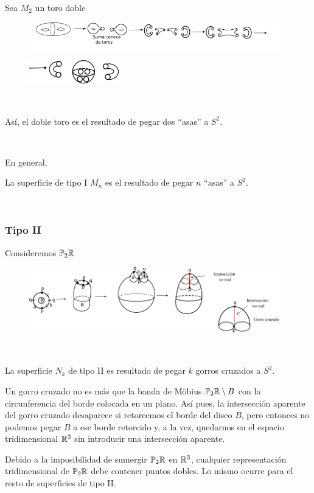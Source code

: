\documentclass[GTSResumen.tex]{subfiles}
\begin{document}
\begin{flushleft}\

Sea $M_2$ un toro doble

\begin{figure}[h!]
	\includegraphics[scale=0.9]{asa1ink}
\end{figure}
\begin{figure}[h!]
	\includegraphics[scale=0.9]{asa2ink}
\end{figure}\

Así, el doble toro es el resultado de pegar dos ``asas'' a $S^2$. 

\end{flushleft}\

En general,


\begin{teorema} La superficie de tipo I $M_n$ es el resultado de pegar $n$ ``asas'' a $S^2$.
\end{teorema}\
\subsubsection{Tipo II}

\begin{flushleft}
Consideremos $\mathbb{P}_2\mathbb{R}$
\begin{figure}[h!]
	\includegraphics[scale=0.7]{gorroink}
\end{figure}
\end{flushleft}\

\begin{teorema} La superficie $N_k$ de tipo II es resultado de pegar $k$ gorros cruzados a $S^2$.
\end{teorema}

\begin{observacion}
Un gorro cruzado no es más que la banda de Möbius $\mathbb{P}_2\mathbb{R}\setminus B$ con la circunferencia del borde colocada en un plano. Así pues, la intersección aparente del gorro cruzado desaparece si retorcemos el borde del disco $B$, pero entonces no podemos pegar $B$ a ese borde retorcido y, a la vez,  quedarnos en el espacio tridimensional $\mathbb{R}^3$ sin introducir una intersección aparente. 

Debido a la imposibilidad de sumergir $\mathbb{P}_2\mathbb{R}$ en $\mathbb{R}^3$, cualquier representación tridimensional de $\mathbb{P}_2\mathbb{R}$ debe contener puntos dobles. Lo mismo ocurre para el resto de superficies de tipo II.


\end{observacion}
\end{document}
